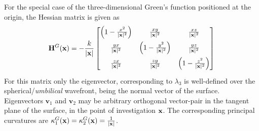 For the special case of the three-dimensional Green's function positioned at the origin, the Hessian matrix is given as
\begin{equation}
\label{Eq:App:Greens_f_hessian}
\mathbf{H}^G(\mathbf{x}) = -\frac{k}{|\mathbf{x}|}
\begin{bmatrix} 
\left( 1-\frac{x^2}{|\mathbf{x}|^2} \right) & \frac{x y}{|\mathbf{x}|^2}                  & \frac{x z}{|\mathbf{x}|^2}                 \\[.7em]
\frac{y x}{|\mathbf{x}|^2}                  & \left( 1-\frac{y^2}{|\mathbf{x}|^2} \right) &\frac{y z}{|\mathbf{x}|^2}                  \\[.7em]
\frac{z x}{|\mathbf{x}|^2}                  & \frac{z y}{|\mathbf{x}|^2}                  &\left( 1-\frac{z^2}{|\mathbf{x}|^2} \right) \\[0.5em]    \end{bmatrix}
\end{equation} 
%
For this matrix only the eigenvector, corresponding to $\lambda_3$ is well-defined over the spherical/\emph{umbilical} wavefront, being the normal vector of the surface.
Eigenvectors $\mathbf{v}_1$ and $\mathbf{v}_2$ may be arbitrary orthogonal vector-pair in the tangent plane of the surface, in the point of investigation $\mathbf{x}$. 
The corresponding principal curvatures are $\kappa_1^G(\mathbf{x}) = \kappa_2^G(\mathbf{x}) = \frac{1}{|\mathbf{x}|}$.

